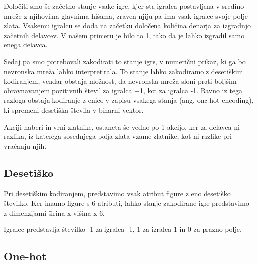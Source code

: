 \documentclass[a4paper, 12pt]{book}
\begin{document}
Določiti smo še začetno stanje vsake igre, kjer sta igralca postavljena v sredino mreže z njihovima glavnima hišama, zraven njiju pa ima vsak igralec svoje polje zlata. 
Vsakemu igralcu se doda na začetku določena količina denarja za izgradnjo začetnih delavcev. V našem primeru je bilo to 1, tako da je lahko izgradil samo enega delavca.

Sedaj pa smo potrebovali zakodirati to stanje igre, v numerični prikaz, ki ga bo nevronska mreža lahko interpretirala. 
To stanje lahko zakodiramo z desetiškim kodiranjem, vendar obstaja možnost, da nevronska mreža sloni proti boljšim obravnavanjem pozitivnih števil za igralca +1, kot za igralca -1. 
Ravno iz tega razloga obstaja kodiranje z enico v zapisu vsakega stanja (ang. one hot encoding), ki spremeni desetiška števila v binarni vektor.

Akciji naberi in vrni zlatnike, ostaneta še vedno po 1 akcijo, ker za delavca ni razlika, iz katerega sosednjega polja zlata vzame zlatnike, kot ni razlike pri vračanju njih.

\subsection{Desetiško}
Pri desetiškim kodiranjem, predstavimo vsak atribut figure z eno desetiško številko.
Ker imamo figure s 6 atributi, lahko stanje zakodirane igre predstavimo z dimenzijami širina x višina x 6.

Igralec predstavlja številko -1 za igralca -1, 1 za igralca 1 in 0 za prazno polje.
\subsection{One-hot}
\end{document}
